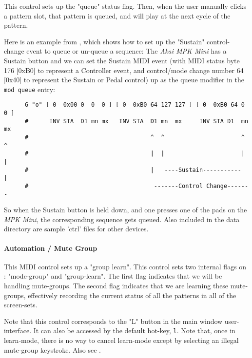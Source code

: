    This control sets up the "queue" status flag.
   Then, when the user manually clicks a pattern slot,
   that pattern is queued, and will play at the next cycle of the
   pattern.

   Here is an example from \cite{midicontrol}, which shows how to set up
   the "Sustain" control-change event to queue or un-queue a sequence:
   The \textsl{Akai MPK Mini} has a Sustain button and we can set the
   Sustain MIDI event (with MIDI status byte 176 [0xB0] to represent a
   Controller event, and control/mode change number 64 [0x40] to
   represent the Sustain or Pedal control) up as the queue modifier in
   the \texttt{mod queue} entry:

   \begin{verbatim}
      6 "o" [ 0  0x00 0  0  0 ] [ 0  0xB0 64 127 127 ] [ 0  0xB0 64 0  0 ]
      #      INV STA  D1 mn mx   INV STA  D1 mn  mx     INV STA D1  mn mx
      #                                   ^  ^                      ^  ^
      #                                   |  |                      |  |
      #                                   |   ----Sustain-----------   |
      #                                    -------Control Change-------
   \end{verbatim}

   So when the Sustain button is held down, and one presses one of the pads
   on the \textsl{MPK Mini}, the corresponding sequence gets queued.
   Also included in the data directory are sample 'ctrl' files for other devices.

\paragraph{Automation / Mute Group}
\label{paragraph:configuration_midi_ctrl_modgmute}

   This MIDI control sets up a "group learn".
   This control sets two internal flags on : "mode-group" and "group-learn".
   The first flag indicates that we will be handling mute-groups.
   The second flag indicates that we are learning these mute-groups,
   effectively recording the current status of all the patterns in all of the
   screen-sets.

   Note that this control corresponds to the "L" button in the main window
   user-interface.
   It can also be accessed by the default hot-key, \texttt{l}.
   Note that, once in learn-mode, there is no way to cancel learn-mode
   except by selecting an illegal mute-group keystroke.
   Also see .

